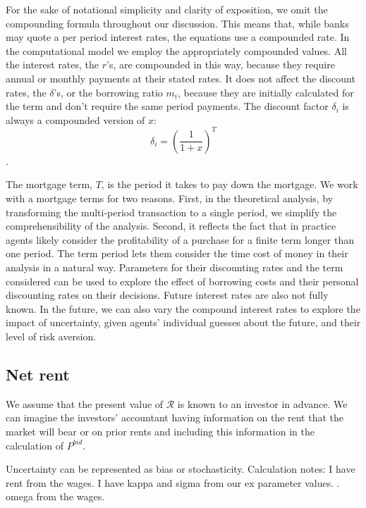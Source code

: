 For the sake of notational simplicity and clarity of exposition,  we omit the compounding formula throughout our discussion. This means that, while banks may quote a per period interest rates, the equations use a compounded rate. In the computational model we employ the appropriately compounded values. All %
 the interest rates, the $r$'s, are compounded in this way, because they require annual or monthly payments at their stated rates.
 It does not affect the discount rates, the $\delta$'s, or the borrowing ratio $m_i$, because they are initially calculated for the term and don't require the same period payments.
 The discount factor $\delta_i$ is always a compounded version of $x$:
 \[\delta_i=\left(\frac{1}{1+x}\right)^T\].

The {mortgage term}, $T$, is the period it takes to pay down the mortgage. We work with a mortgage terms for two reasons. First, in the theoretical analysis, by transforming the multi-period transaction to a single period, we simplify the comprehensibility of the analysis. Second, it reflects the fact that in practice agents  likely consider the profitability of a purchase for a finite term longer than one period. The term period lets them consider the time cost of money in their analysis in a natural way. Parameters for their discounting rates and the term considered can be used to explore the effect of borrowing costs and their personal discounting rates on their decisions. Future interest rates are also not fully known. In the future, we can also vary the compound interest rates to explore the impact of uncertainty, given agents' individual guesses about the future, and their level of risk aversion.



\subsection{Net rent}\label{SS:NetRent}

We assume that the present value of $\mathcal{R}$ is known to an investor in advance. We can imagine the investors' accountant having information on the rent that the market will bear or on prior rents and including this information in the calculation of $P^{bid}$.

Uncertainty can be represented as bias or stochasticity.
Calculation notes: I have rent from the wages. I have kappa and sigma from our ex parameter values. . omega from the wages. 

